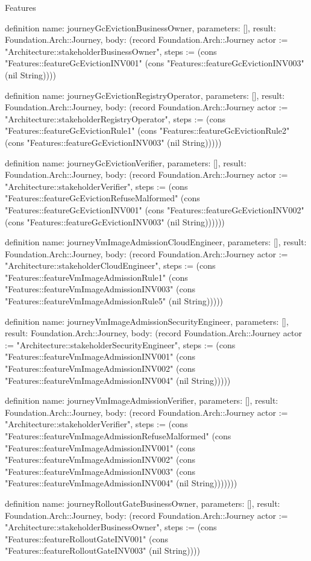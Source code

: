 \begin{lexlean}{Features}
\begin{semanticmodule}
definition{
  name: journeyGcEvictionBusinessOwner,
  parameters: [],
  result: Foundation.Arch::Journey,
  body: (record Foundation.Arch::Journey {actor := "Architecture::stakeholderBusinessOwner", steps := (cons "Features::featureGcEvictionINV001" (cons "Features::featureGcEvictionINV003" (nil String)))})
}

definition{
  name: journeyGcEvictionRegistryOperator,
  parameters: [],
  result: Foundation.Arch::Journey,
  body: (record Foundation.Arch::Journey {actor := "Architecture::stakeholderRegistryOperator", steps := (cons "Features::featureGcEvictionRule1" (cons "Features::featureGcEvictionRule2" (cons "Features::featureGcEvictionINV003" (nil String))))})
}

definition{
  name: journeyGcEvictionVerifier,
  parameters: [],
  result: Foundation.Arch::Journey,
  body: (record Foundation.Arch::Journey {actor := "Architecture::stakeholderVerifier", steps := (cons "Features::featureGcEvictionRefuseMalformed" (cons "Features::featureGcEvictionINV001" (cons "Features::featureGcEvictionINV002" (cons "Features::featureGcEvictionINV003" (nil String)))))})
}

definition{
  name: journeyVmImageAdmissionCloudEngineer,
  parameters: [],
  result: Foundation.Arch::Journey,
  body: (record Foundation.Arch::Journey {actor := "Architecture::stakeholderCloudEngineer", steps := (cons "Features::featureVmImageAdmissionRule1" (cons "Features::featureVmImageAdmissionINV003" (cons "Features::featureVmImageAdmissionRule5" (nil String))))})
}

definition{
  name: journeyVmImageAdmissionSecurityEngineer,
  parameters: [],
  result: Foundation.Arch::Journey,
  body: (record Foundation.Arch::Journey {actor := "Architecture::stakeholderSecurityEngineer", steps := (cons "Features::featureVmImageAdmissionINV001" (cons "Features::featureVmImageAdmissionINV002" (cons "Features::featureVmImageAdmissionINV004" (nil String))))})
}

definition{
  name: journeyVmImageAdmissionVerifier,
  parameters: [],
  result: Foundation.Arch::Journey,
  body: (record Foundation.Arch::Journey {actor := "Architecture::stakeholderVerifier", steps := (cons "Features::featureVmImageAdmissionRefuseMalformed" (cons "Features::featureVmImageAdmissionINV001" (cons "Features::featureVmImageAdmissionINV002" (cons "Features::featureVmImageAdmissionINV003" (cons "Features::featureVmImageAdmissionINV004" (nil String))))))})
}

definition{
  name: journeyRolloutGateBusinessOwner,
  parameters: [],
  result: Foundation.Arch::Journey,
  body: (record Foundation.Arch::Journey {actor := "Architecture::stakeholderBusinessOwner", steps := (cons "Features::featureRolloutGateINV001" (cons "Features::featureRolloutGateINV003" (nil String)))})
}


\end{semanticmodule}
\end{lexlean}
